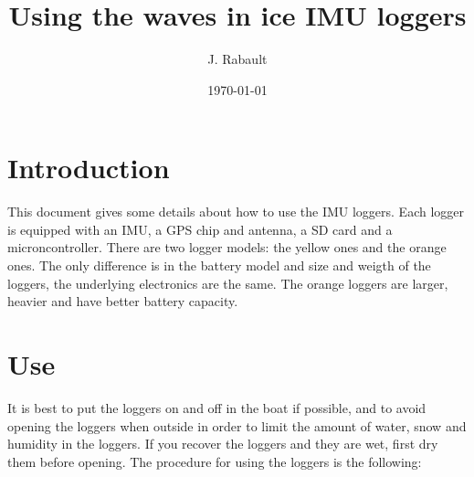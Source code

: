 \documentclass[pdftex,a4paper,12pt,twocolumn,fleqn,captions=tableheading]{scrartcl}
\begin{document}
\title{Using the waves in ice IMU loggers}
\author{J. Rabault
  }
\date{\today}

\maketitle

\section{Introduction}

This document gives some details about how to use the IMU loggers. Each logger is equipped with an IMU, a GPS chip and antenna, a SD card and a microncontroller. There are two logger models: the yellow ones and the orange ones. The only difference is in the battery model and size and weigth of the loggers, the underlying electronics are the same. The orange loggers are larger, heavier and have better battery capacity.

\section{Use}

It is best to put the loggers on and off in the boat if possible, and to avoid opening the loggers when outside in order to limit the amount of water, snow and humidity in the loggers. If you recover the loggers and they are wet, first dry them before opening. The procedure for using the loggers is the following:
\end{document}
